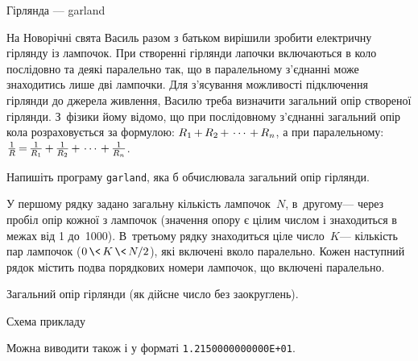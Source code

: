 \documentclass[14pt,a4paper]{extarticle}
\def\dib#1{\,#1\discretionary{}{\mbox{$#1$}}{}\,}
\begin{document}
\begin{problemAllDefault}{Гірлянда --- garland}


На Новорічні свята Василь разом з батьком вирішили зробити електричну гірлянду із лампочок. При створенні гірлянди лапочки включаються в коло послідовно та деякі паралельно так, що в паралельному з’єднанні може знаходитись лише дві лампочки. Для з’ясування можливості підключення гірлянди до джерела живлення, Василю треба визначити загальний опір створеної гірлянди. З~фізики йому відомо, що при послідовному з’єднанні загальний опір кола розраховується за формулою: $R_1\dib{{+}}R_2\dib{{+}}\cdots\dib{{+}}R_n$, а при паралельному: $\frac{1}{R} \dib{{=}} \frac{1}{R_1} \dib{{+}} \frac{1}{R_2} \dib{{+}} \cdots \dib{{+}} \frac{1}{R_n}$.

\Task Напишіть програму \texttt{garland}, яка б обчислювала загальний опір гірлянди.

\InputFile У першому рядку задано загальну кількість лампочок~$N$, в~другому\nolinebreak[3] --- через пробіл опір кожної з лампочок (значення опору є цілим числом і знаходиться в межах від 1 до~1000). В~третьому рядку знаходиться ціле число~$K$\nolinebreak[3] --- кількість пар лампочок ($0\dib{{\<}}K\dib{{\<}}{N/2}$), які включені в\nolinebreak[3] коло паралельно. Кожен наступний рядок містить по\nolinebreak[2] два порядкових номери лампочок, що включені паралельно.

\OutputFile Загальний опір гірлянди (як дійсне число без заокруглень).

\Example

\vspace{-\baselineskip}

\begin{exampleSimpleThree}{6em}{3em}{14.5em}{Схема прикладу}
%
\end{exampleSimpleThree}


\Note %
Можна виводити також і у форматі \texttt{1.2150000000000E+01}.

\end{problemAllDefault}
	
\end{document}
